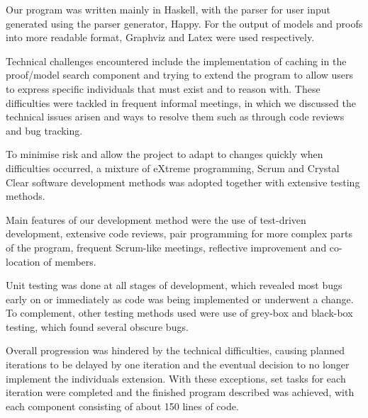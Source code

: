 
Our program was written mainly in Haskell, with the parser for user input generated using the parser generator, Happy. For the output of models and proofs into more readable format, Graphviz and Latex were used respectively.

Technical challenges encountered include the implementation of caching in the proof/model search component and trying to extend the program to allow users to express specific individuals that must exist and to reason with. These difficulties were tackled in frequent informal meetings, in which we discussed the technical issues arisen and ways to resolve them such as through code reviews and bug tracking.

To minimise risk and allow the project to adapt to changes quickly when difficulties occurred, a mixture of eXtreme programming, Scrum and Crystal Clear software development methods was adopted together with extensive testing methods.

Main features of our development method were the use of test-driven development, extensive code reviews, pair programming for more complex parts of the program, frequent Scrum-like meetings, reflective improvement and co-location of members.

Unit testing was done at all stages of development, which revealed most bugs early on or immediately as code was being implemented or underwent a change. To complement, other testing methods used were use of grey-box and black-box testing, which found several obscure bugs.

Overall progression was hindered by the technical difficulties, causing planned iterations to be delayed by one iteration and the eventual decision to no longer implement the individuals extension. With these exceptions, set tasks for each iteration were completed and the finished program described was achieved, with each component consisting of about 150 lines of code.

